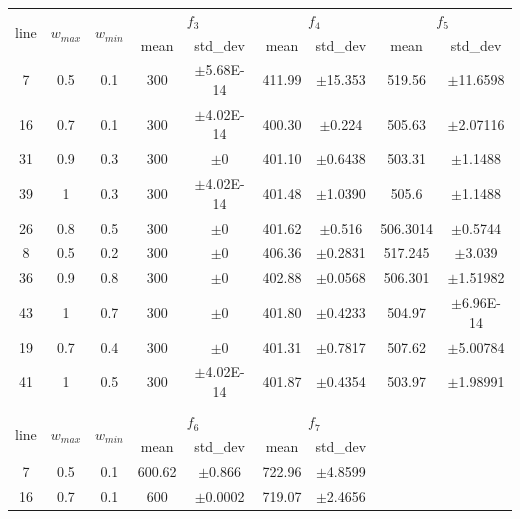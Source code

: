 \documentclass[letterpaper,12pt]{article}
\begin{document}
\begin{table}[!h]
\begin{tabular}{|c|c|c|c|c|c|c|c|c|}
\hline
\multirow{2}{*}{line} &
  \multirow{2}{*}{$w_{max}$} &
  \multirow{2}{*}{$w_{min}$} &
  \multicolumn{2}{c|}{$f_3$} &
  \multicolumn{2}{c|}{$f_4$} &
  \multicolumn{2}{c|}{$f_5$} \\ \cline{4-9} 
   &     &     & mean   & std\_dev      & mean   & std\_dev    & mean     & std\_dev      \\ \hline
7  & 0.5 & 0.1 & 300    & $\pm$5.68E-14 & 411.99 & $\pm$15.353 & 519.56   & $\pm$11.6598  \\ \hline
16 & 0.7 & 0.1 & 300    & $\pm$4.02E-14 & 400.30 & $\pm$0.224  & 505.63   & $\pm$2.07116  \\ \hline
31 & 0.9 & 0.3 & 300    & $\pm$0        & 401.10 & $\pm$0.6438 & 503.31   & $\pm$1.1488   \\ \hline
39 & 1   & 0.3 & 300    & $\pm$4.02E-14 & 401.48 & $\pm$1.0390 & 505.6    & $\pm$1.1488   \\ \hline
26 & 0.8 & 0.5 & 300    & $\pm$0        & 401.62 & $\pm$0.516  & 506.3014 & $\pm$0.5744   \\ \hline
8  & 0.5 & 0.2 & 300    & $\pm$0        & 406.36 & $\pm$0.2831 & 517.245  & $\pm$3.039    \\ \hline
36 & 0.9 & 0.8 & 300    & $\pm$0        & 402.88 & $\pm$0.0568 & 506.301  & $\pm$1.51982  \\ \hline
43 & 1   & 0.7 & 300    & $\pm$0        & 401.80 & $\pm$0.4233 & 504.97   & $\pm$6.96E-14 \\ \hline
19 & 0.7 & 0.4 & 300    & $\pm$0        & 401.31 & $\pm$0.7817 & 507.62   & $\pm$5.00784  \\ \hline
41 & 1   & 0.5 & 300    & $\pm$4.02E-14 & 401.87 & $\pm$0.4354 & 503.97   & $\pm$1.98991  \\ \hline
\multicolumn{9}{|c|}{}                                                                    \\ \hline
\multirow{2}{*}{line} &
  \multirow{2}{*}{$w_{max}$} &
  \multirow{2}{*}{$w_{min}$} &
  \multicolumn{2}{c|}{$f_6$} &
  \multicolumn{2}{c|}{$f_7$} &
  \multicolumn{2}{c|}{\multirow{12}{*}{}} \\ \cline{4-7}
   &     &     & mean   & std\_dev      & mean   & std\_dev    & \multicolumn{2}{c|}{}    \\ \cline{1-7}
7  & 0.5 & 0.1 & 600.62 & $\pm$0.866    & 722.96 & $\pm$4.8599 & \multicolumn{2}{c|}{}    \\ \cline{1-7}
16 & 0.7 & 0.1 & 600    & $\pm$0.0002   & 719.07 & $\pm$2.4656 & \multicolumn{2}{c|}{}    \\ \cline{1-7}

\end{tabular}
\end{table}
\end{document}
